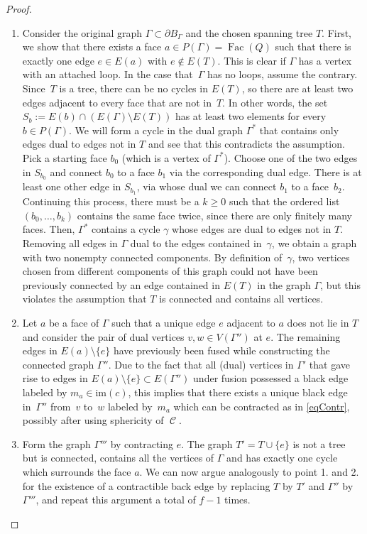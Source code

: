 \documentclass[pdftex]{sigma}
\DeclareMathOperator{\calc}{\mathcal{C}}
\DeclareMathOperator{\Fac}{\mathrm{Fac}}
\numberwithin{equation}{section}
\theoremstyle{definition}
\begin{document}
\begin{proof}
 \begin{enumerate}\itemsep=0pt
 \item Consider the original graph $\Gamma \subset \partial B_{\Gamma}$ and the chosen spanning tree $T$. First, we show that there exists a face $a \in P(\Gamma) =\Fac(Q)$ such that there is exactly one edge $e \in E(a)$ with $e \notin E(T)$. This is clear if $\Gamma$ has a vertex with an attached loop. In the case that~$\Gamma$ has no loops, assume the contrary. Since~$T$ is a tree, there can be no cycles in $E(T)$, so there are at least two edges adjacent to every face that are not in~$T$. In other words, the set $S_b := E(b) \cap \left(E(\Gamma)\setminus E(T)\right)$ has at least two elements for every $b \in P(\Gamma)$. We will form a cycle in the dual graph $\Gamma^*$ that contains only edges dual to edges not in $T$ and see that this contradicts the assumption. Pick a starting face $b_0$ (which is a vertex of $\Gamma^*$). Choose one of the two edges in $S_{b_0}$ and connect $b_0$ to a face $b_1$ via the corresponding dual edge. There is at least one other edge in $S_{b_1}$, via whose dual we can connect $b_1$ to a face~$b_2$. Continuing this process, there must be a $k \geq 0$ such that the ordered list $(b_0, \dots, b_k)$ contains the same face twice, since there are only finitely many faces. Then, $\Gamma^*$ contains a cycle $\gamma$ whose edges are dual to edges not in $T$. Removing all edges in $\Gamma$ dual to the edges contained in~$\gamma$, we obtain a graph with two nonempty connected components. By definition of~$\gamma$, two vertices chosen from different components of this graph could not have been previously connected by an edge contained in $E(T)$ in the graph $\Gamma$, but this violates the assumption that $T$ is connected and contains all vertices.
 \item Let $a$ be a face of $\Gamma$ such that a unique edge $e$ adjacent to $a$ does not lie in $T$ and consider the pair of dual vertices $v, w \in V(\Gamma'')$ at $e$. The remaining edges in $E(a)\setminus\{e\}$ have previously been fused while constructing the connected graph $\Gamma''$. Due to the fact that all (dual) vertices in $\Gamma'$ that gave rise to edges in $E(a)\setminus\{e\} \subset E(\Gamma'')$ under fusion possessed a black edge labeled by $m_a \in \mathrm{im}(c)$, this implies that there exists a unique black edge in~$\Gamma''$ from~$v$ to~$w$ labeled by~$m_a$ which can be contracted as in \eqref{eqContr}, possibly after using sphericity of $\calc$.
 \item Form the graph $\Gamma'''$ by contracting $e$. The graph $T' = T \cup \{e\}$ is not a tree but is connected, contains all the vertices of $\Gamma$ and has exactly one cycle which surrounds the face $a$. We can now argue analogously to point 1. and 2. for the existence of a contractible back edge by replacing $T$ by $T'$ and $\Gamma''$ by $\Gamma'''$, and repeat this argument a total of $f-1$ times.

\end{enumerate}
\end{proof}
\end{document}
